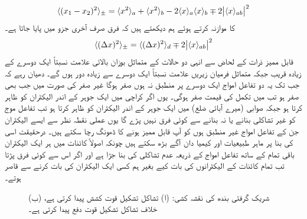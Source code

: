 \begin{align}
	\langle(x_1-x_2)^2\rangle_{\pm}=\langle x^2\rangle_a+\langle x^2 \rangle_b-2\langle x \rangle_a\langle x \rangle_b\mp2\abs{\langle x \rangle_{ab}}^2
\end{align}
 کا موازنہ کرتے ہوئے ہم دیکھتے ہیں کہ فرق صرف آخری جزو میں پایا جاتا ہے۔
\begin{align}
	\langle(\Delta x)^2\rangle_{\pm}=\langle(\Delta x)^2\rangle_d\mp2\abs{\langle x \rangle_{ab}}^2
\end{align}
قابل ممیز ذرات کے لحاض سے انہی دو حالات کے متماثل بوزان بالائی علامت نسبتاً ایک دوسرے کے زیادہ قریب جبکہ متماثل فرمیان زیریں علامت نسبتاً ایک دوسرے سے زیادہ دور ہوں گے۔ دھیان رہے کہ جب تک یہ دو تفاعل امواج ایک دوسرے  پر منطبق نہ ہوں  صفر ہوگا غیر صفر  کی صورت میں جب بھی  صفر ہو تب  میں تکمل کی قیمت صفر ہوگی۔ یوں اگر کراچی میں ایک جوہر کے اندر الیکٹران کو  ظاہر کرتا ہو جبکہ صوابی  (میرے آبائی ضلع) میں ایک جوہر کے اندر الیکٹران کو  ظاہر کرتا ہو تب تفاعل موج کو غیر تشاکلی بنانے یا نہ بنانے سے کوئی فرق نہیں پڑے گا یوں عملی نقطہ نظر سے ایسے الیکٹران جن کے تفاعل امواج  غیر منطبق  ہوں کو آپ قابل ممیز ہونے کا ڈھونگ رچا سکتے ہیں۔ درحقیقت اسی کی بنا پر  ماہر طبیعیات اور کیمیا دان  آگے بڑھ سکتے ہیں چونکہ اصولاً   کائنات  میں ہر ایک الیکٹران باقی تمام کے ساتھ تفاعل امواج کے ذریعہ عدم تشاکلی کی بنا جڑا ہے اور اگر اس سے کوئی فرق پڑتا تب تمام کائنات کے الیکٹرانوں کی بات کیے بغیر ہم کسی ایک الیکٹران کی بات کرنے سے قاصر ہوتے۔

\begin{figure}
\centering
\begin{subfigure}{0.35\textwidth} 
\centering
{}
\caption{}
\end{subfigure}\hfill
\begin{subfigure}{0.55\textwidth} 
\centering
{}
\caption{}
\end{subfigure}
\caption{شریک گرفتی بندھ کی نقشہ کشی: (ا)  تشاکل تشکیل  قوت کشش پیدا کرتی ہے، (ب)  خلاف تشاکل تشکیل  قوت دفع پیدا کرتی ہے۔}
\label{شکل_دو_اجزا_تشاکل_اور_خلاف_تشاکل_تشکیل}
\end{figure}


